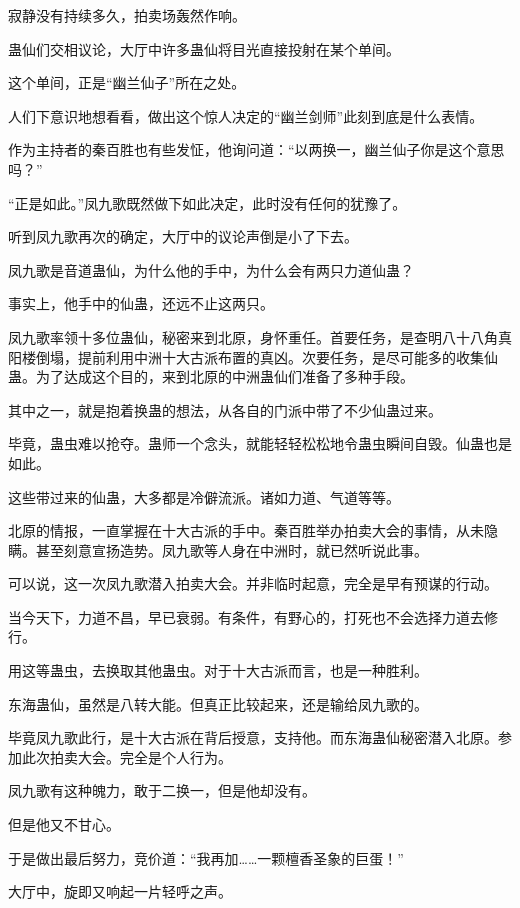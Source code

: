 
\begin{this_body}

寂静没有持续多久，拍卖场轰然作响。

蛊仙们交相议论，大厅中许多蛊仙将目光直接投射在某个单间。

这个单间，正是“幽兰仙子”所在之处。

人们下意识地想看看，做出这个惊人决定的“幽兰剑师”此刻到底是什么表情。

作为主持者的秦百胜也有些发怔，他询问道：“以两换一，幽兰仙子你是这个意思吗？”

“正是如此。”凤九歌既然做下如此决定，此时没有任何的犹豫了。

听到凤九歌再次的确定，大厅中的议论声倒是小了下去。

凤九歌是音道蛊仙，为什么他的手中，为什么会有两只力道仙蛊？

事实上，他手中的仙蛊，还远不止这两只。

凤九歌率领十多位蛊仙，秘密来到北原，身怀重任。首要任务，是查明八十八角真阳楼倒塌，提前利用中洲十大古派布置的真凶。次要任务，是尽可能多的收集仙蛊。为了达成这个目的，来到北原的中洲蛊仙们准备了多种手段。

其中之一，就是抱着换蛊的想法，从各自的门派中带了不少仙蛊过来。

毕竟，蛊虫难以抢夺。蛊师一个念头，就能轻轻松松地令蛊虫瞬间自毁。仙蛊也是如此。

这些带过来的仙蛊，大多都是冷僻流派。诸如力道、气道等等。

北原的情报，一直掌握在十大古派的手中。秦百胜举办拍卖大会的事情，从未隐瞒。甚至刻意宣扬造势。凤九歌等人身在中洲时，就已然听说此事。

可以说，这一次凤九歌潜入拍卖大会。并非临时起意，完全是早有预谋的行动。

当今天下，力道不昌，早已衰弱。有条件，有野心的，打死也不会选择力道去修行。

用这等蛊虫，去换取其他蛊虫。对于十大古派而言，也是一种胜利。

东海蛊仙，虽然是八转大能。但真正比较起来，还是输给凤九歌的。

毕竟凤九歌此行，是十大古派在背后授意，支持他。而东海蛊仙秘密潜入北原。参加此次拍卖大会。完全是个人行为。

凤九歌有这种魄力，敢于二换一，但是他却没有。

但是他又不甘心。

于是做出最后努力，竞价道：“我再加……一颗檀香圣象的巨蛋！”

大厅中，旋即又响起一片轻呼之声。


\end{this_body}
